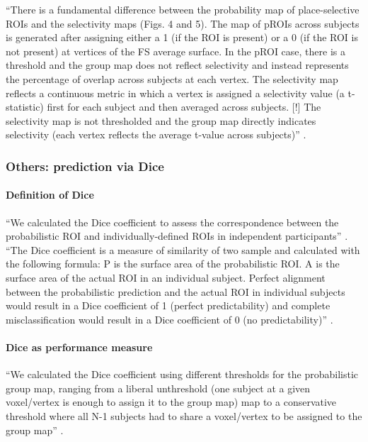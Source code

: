 %
``There is a fundamental difference between the probability map of
place-selective ROIs and the selectivity maps (Figs. 4 and 5).
%
The map of pROIs across subjects is generated after assigning either a 1 (if the
ROI is present) or a 0 (if the ROI is not present) at vertices of the FS average
surface.
%
In the pROI case, there is a threshold and the group map does not reflect
selectivity and instead represents the percentage of overlap across subjects at
each vertex.
%
The selectivity map reflects a continuous metric in which a vertex is assigned a
selectivity value (a t-statistic) first for each subject and then averaged
across subjects.
%
[!] The selectivity map is not thresholded and the group map directly indicates
selectivity (each vertex reflects the average t-value across subjects)''
\citep{weiner2018defining}.



\subsubsection{Others: prediction via Dice}

\paragraph{Definition of Dice}

``We calculated the Dice coefficient to assess the correspondence between the
probabilistic ROI and individually-defined ROIs in independent participants''
\citep{weiner2018defining}.
%
``The Dice coefficient is a measure of similarity of two sample and calculated
with the following formula:
%
P is the surface area of the probabilistic ROI.
%
A is the surface area of the actual ROI in an individual subject.
%
Perfect alignment between the probabilistic prediction and the actual ROI in
individual subjects would result in a Dice coefficient of 1 (perfect
predictability) and complete misclassification would result in a Dice
coefficient of 0 (no predictability)'' \citep{weiner2018defining}.


\paragraph{Dice as performance measure}


%
``We calculated the Dice coefficient using different thresholds for the
probabilistic group map, ranging from a liberal unthreshold (one subject at a
given voxel/vertex is enough to assign it to the group map) map to a
conservative threshold where all N-1 subjects had to share a voxel/vertex to be
assigned to the group map'' \citet{rosenke2021probabilistic}.

